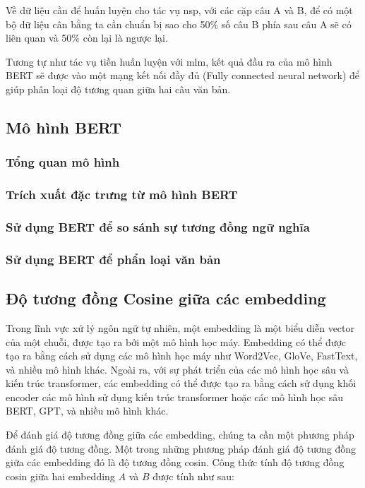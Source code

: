 \documentclass[a4paper, 12pt, openany]{book}
\begin{document}
Về dữ liệu cần để huấn luyện cho tác vụ \acl{nsp}, với các cặp câu A và B, để có một bộ dữ liệu cân bằng
ta cần chuẩn bị sao cho 50\% số câu B phía sau câu A sẽ có liên quan và 50\% còn lại là ngược lại.

Tương tự như tác vụ tiền huấn luyện với \acl{mlm}, kết quả đầu ra của mô hình BERT sẽ được vào một mạng kết nối đầy đủ
(Fully connected neural network) để giúp phân loại độ tương quan giữa hai câu văn bản.


\subsection{Mô hình BERT}
\subsubsection{Tổng quan mô hình}
\subsubsection{Trích xuất đặc trưng từ mô hình BERT}
\subsubsection{Sử dụng BERT để so sánh sự tương đồng ngữ nghĩa}
\subsubsection{Sử dụng BERT để phẩn loại văn bản}

\subsection{Độ tương đồng Cosine giữa các embedding}

Trong lĩnh vực xử lý ngôn ngữ tự nhiên, một embedding là một biểu diễn vector của một chuỗi, được tạo ra bởi một mô hình học máy. Embedding có thể được tạo ra bằng cách sử dụng các mô hình học máy như Word2Vec, GloVe, FastText, và nhiều mô hình khác.
Ngoài ra, với sự phát triển của các mô hình học sâu và kiến trúc transformer, các embedding có thể được tạo ra bằng cách sử dụng khối encoder các mô hình sử dụng kiến trúc transformer hoặc các mô hình học sâu BERT, GPT, và nhiều mô hình khác.

Để đánh giá độ tương đồng giữa các embedding, chúng ta cần một phương pháp đánh giá độ tương đồng. Một trong những phương pháp đánh giá độ tương đồng giữa các embedding đó là độ tương đồng cosin. Công thức tính độ tương đồng cosin giữa hai embedding $A$ và $B$ được tính như sau:
\end{document}
